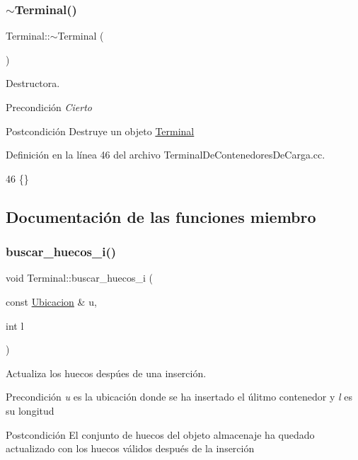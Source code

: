 \subsubsection{\texorpdfstring{$\sim$\+Terminal()}{~Terminal()}}
{\footnotesize\ttfamily Terminal\+::$\sim$\+Terminal (\begin{DoxyParamCaption}{ }\end{DoxyParamCaption})}



Destructora. 

\begin{DoxyPrecond}{Precondición}
{\itshape Cierto} 
\end{DoxyPrecond}
\begin{DoxyPostcond}{Postcondición}
Destruye un objeto \hyperlink{class_terminal}{Terminal} 
\end{DoxyPostcond}


Definición en la línea 46 del archivo Terminal\+De\+Contenedores\+De\+Carga.\+cc.


\begin{DoxyCode}
46 \{\}
\end{DoxyCode}


\subsection{Documentación de las funciones miembro}
\mbox{\label{class_terminal_a204fc08e3b6f13f75c525f282b023b19}} 
\subsubsection{\texorpdfstring{buscar\+\_\+huecos\+\_\+i()}{buscar\_huecos\_i()}}
{\footnotesize\ttfamily void Terminal\+::buscar\+\_\+huecos\+\_\+i (\begin{DoxyParamCaption}\item[{const \hyperlink{class_ubicacion}{Ubicacion} \&}]{u,  }\item[{int}]{l }\end{DoxyParamCaption})\hspace{0.3cm}{\ttfamily [private]}}



Actualiza los huecos despúes de una inserción. 

\begin{DoxyPrecond}{Precondición}
{\itshape u} es la ubicación donde se ha insertado el úlitmo contenedor y {\itshape l} es su longitud 
\end{DoxyPrecond}
\begin{DoxyPostcond}{Postcondición}
El conjunto de huecos del objeto almacenaje ha quedado actualizado con los huecos válidos después de la inserción 
\end{DoxyPostcond}


